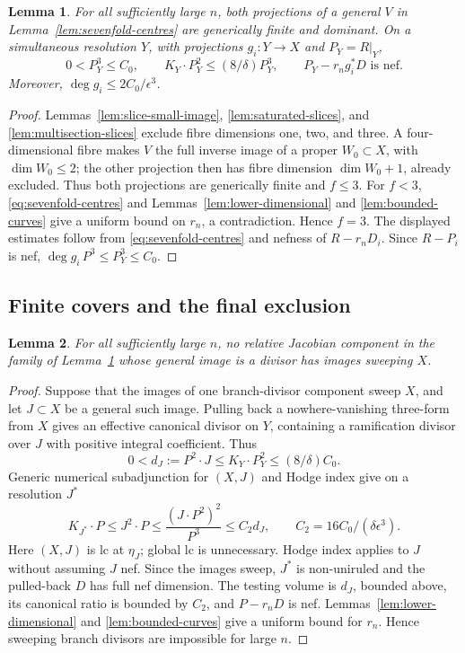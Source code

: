 \documentclass[12pt,a4paper,psamsfonts]{amsart}
\theoremstyle{definition}
\theoremstyle{plain}
\newtheorem{lemma}{Lemma}[section]
\begin{document}
\begin{lemma}\label{lem:finite-correspondences}
For all sufficiently large $n$, both projections of a general
$V$ in Lemma~\ref{lem:sevenfold-centres} are generically finite
and dominant. On a simultaneous resolution $Y$, with projections
$g_i:Y\to X$ and $P_Y=R|_Y$,
\begin{equation}\label{eq:correspondence-estimates}
 0<P_Y^3\le C_0,\qquad K_Y\cdot P_Y^2\le(8/\delta)P_Y^3,
 \qquad P_Y-r_ng_i^*D\text{ is nef}.
\end{equation}
Moreover, $\deg g_i\le2C_0/\epsilon^3$.
\end{lemma}
\begin{proof}
Lemmas~\ref{lem:slice-small-image}, \ref{lem:saturated-slices},
and \ref{lem:multisection-slices} exclude fibre dimensions one,
two, and three. A four-dimensional fibre makes $V$ the full
inverse image of a proper $W_0\subset X$, with $\dim W_0\le2$;
the other projection then has fibre dimension $\dim W_0+1$, already
excluded. Thus both projections are generically finite and $f\le3$.
For $f<3$, \eqref{eq:sevenfold-centres} and
Lemmas~\ref{lem:lower-dimensional} and \ref{lem:bounded-curves}
give a uniform bound on $r_n$, a contradiction. Hence $f=3$.
The displayed estimates follow from \eqref{eq:sevenfold-centres}
and nefness of $R-r_nD_i$.
Since $R-P_i$ is nef, $\deg g_i\,P^3\le P_Y^3\le C_0$.
\end{proof}


\subsection{Finite covers and the final exclusion}

\begin{lemma}\label{lem:branch-surfaces}
For all sufficiently large $n$, no relative Jacobian component
in the family of Lemma~\ref{lem:finite-correspondences} whose
general image is a divisor has images sweeping $X$.
\end{lemma}
\begin{proof}
Suppose that the images of one branch-divisor component sweep
$X$, and let $J\subset X$ be a general such image. Pulling back
a nowhere-vanishing three-form from $X$ gives an effective
canonical divisor on $Y$, containing a ramification divisor
over $J$ with positive integral coefficient. Thus
\[
 0<d_J:=P^2\cdot J\le K_Y\cdot P_Y^2\le(8/\delta)C_0.
\]
Generic numerical subadjunction for $(X,J)$ and Hodge index give
on a resolution $J^*$
\begin{equation}\label{eq:branch-surface}
 K_{J^*}\cdot P\le J^2\cdot P
 \le\frac{(J\cdot P^2)^2}{P^3}\le C_2d_J,
 \qquad C_2=16C_0/(\delta\epsilon^3).
\end{equation}
Here $(X,J)$ is lc at $\eta_J$; global lc is unnecessary.
Hodge index applies to $J$ without assuming $J$ nef.
Since the images sweep, $J^*$ is non-uniruled and the pulled-back
$D$ has full nef dimension. The testing volume is $d_J$, bounded
above, its canonical ratio is bounded by $C_2$, and $P-r_nD$ is
nef. Lemmas~\ref{lem:lower-dimensional} and
\ref{lem:bounded-curves} give a uniform bound for $r_n$.
Hence sweeping branch divisors are impossible for large $n$.
\end{proof}
\end{document}
